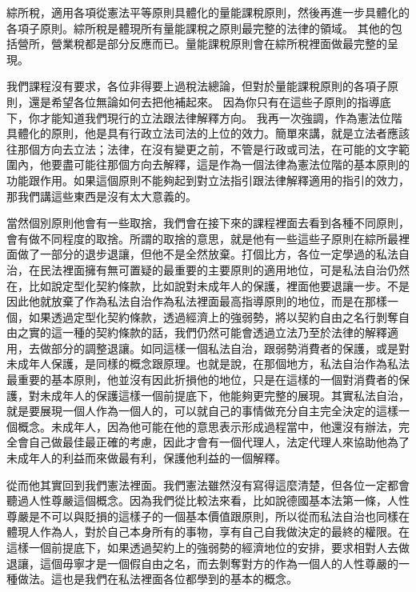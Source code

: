 \documentclass[]{ctexbook}
\begin{document}
綜所稅，適用各項從憲法平等原則具體化的量能課稅原則，然後再進一步具體化的各項子原則。綜所稅是體現所有量能課稅之原則最完整的法律的領域。
其他的包括營所，營業稅都是部分反應而已。量能課稅原則會在綜所稅裡面做最完整的呈現。

我們課程沒有要求，各位非得要上過稅法總論，但對於量能課稅原則的各項子原則，還是希望各位無論如何去把他補起來。
因為你只有在這些子原則的指導底下，你才能知道我們現行的立法跟法律解釋方向。
我再一次強調，作為憲法位階具體化的原則，他是具有行政立法司法的上位的效力。簡單來講，就是立法者應該往那個方向去立法；法律，在沒有變更之前，不管是行政或司法，在可能的文字範圍內，他要盡可能往那個方向去解釋，這是作為一個法律為憲法位階的基本原則的功能跟作用。如果這個原則不能夠起到對立法指引跟法律解釋適用的指引的效力，那我們講這些東西是沒有太大意義的。

當然個別原則他會有一些取捨，我們會在接下來的課程裡面去看到各種不同原則，會有做不同程度的取捨。所謂的取捨的意思，就是他有一些這些子原則在綜所最裡面做了一部分的退步退讓，但他不是全然放棄。打個比方，各位一定學過的私法自治，在民法裡面擁有無可置疑的最重要的主要原則的適用地位，可是私法自治仍然在，比如說定型化契約條款，比如說對未成年人的保護，裡面他要退讓一步。不是因此他就放棄了作為私法自治作為私法裡面最高指導原則的地位，而是在那樣一個，如果透過定型化契約條款，透過經濟上的強弱勢，將以契約自由之名行剝奪自由之實的這一種的契約條款的話，我們仍然可能會透過立法乃至於法律的解釋適用，去做部分的調整退讓。如同這樣一個私法自治，跟弱勢消費者的保護，或是對未成年人保護，是同樣的概念跟原理。也就是說，在那個地方，私法自治作為私法最重要的基本原則，他並沒有因此折損他的地位，只是在這樣的一個對消費者的保護，對未成年人的保護這樣一個前提底下，他能夠更完整的展現。其實私法自治，就是要展現一個人作為一個人的，可以就自己的事情做充分自主完全決定的這樣一個概念。未成年人，因為他可能在他的意思表示形成過程當中，他還沒有辦法，完全會自己做最佳最正確的考慮，因此才會有一個代理人，法定代理人來協助他為了未成年人的利益而來做最有利，保護他利益的一個解釋。

從而他其實回到我們憲法裡面。我們憲法雖然沒有寫得這麼清楚，但各位一定都會聽過人性尊嚴這個概念。因為我們從比較法來看，比如說德國基本法第一條，人性尊嚴是不可以與貶損的這樣子的一個基本價值跟原則，所以從而私法自治也同樣在體現人作為人，對於自己本身所有的事物，享有自己自我做決定的最終的權限。在這樣一個前提底下，如果透過契約上的強弱勢的經濟地位的安排，要求相對人去做退讓，這個毋寧才是一個假自由之名，而去剝奪對方的作為一個人的人性尊嚴的一種做法。這也是我們在私法裡面各位都學到的基本的概念。
\end{document}
